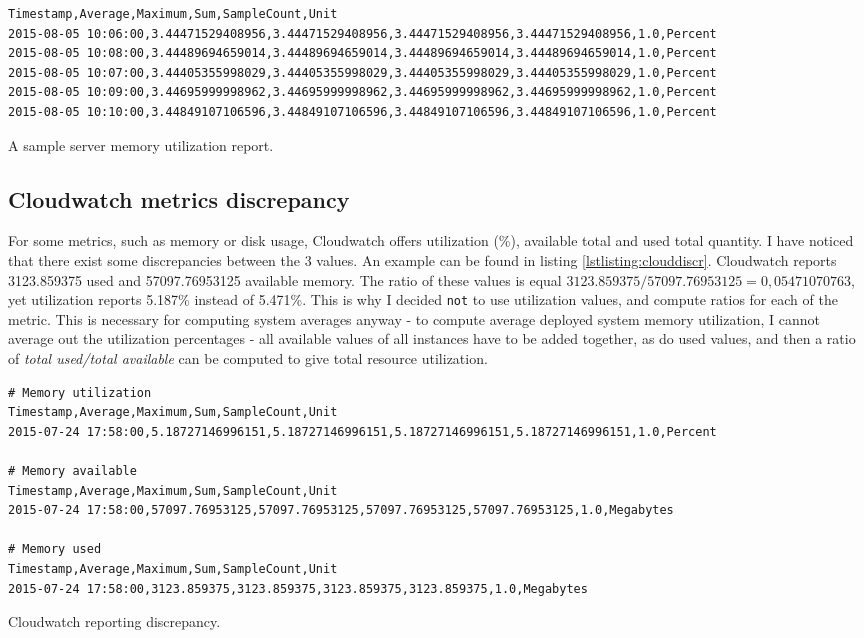 \documentclass{uvamscse}
\begin{document}
\begin{sourcecode}[H]
\begin{lstlisting}[style=mono]
Timestamp,Average,Maximum,Sum,SampleCount,Unit
2015-08-05 10:06:00,3.44471529408956,3.44471529408956,3.44471529408956,3.44471529408956,1.0,Percent
2015-08-05 10:08:00,3.44489694659014,3.44489694659014,3.44489694659014,3.44489694659014,1.0,Percent
2015-08-05 10:07:00,3.44405355998029,3.44405355998029,3.44405355998029,3.44405355998029,1.0,Percent
2015-08-05 10:09:00,3.44695999998962,3.44695999998962,3.44695999998962,3.44695999998962,1.0,Percent
2015-08-05 10:10:00,3.44849107106596,3.44849107106596,3.44849107106596,3.44849107106596,1.0,Percent
\end{lstlisting}
\caption{A sample server memory utilization report.}
\label{lstlisting:memutilsrv}
\end{sourcecode}

\subsection{Cloudwatch metrics discrepancy}

For some metrics, such as memory or disk usage, Cloudwatch offers utilization (\%), available total and used total quantity. I have noticed that there exist some discrepancies between the 3 values. An example can be found in listing \ref{lstlisting:clouddiscr}. Cloudwatch reports 3123.859375 used and 57097.76953125 available memory. The ratio of these values is equal $3123.859375 / 57097.76953125 = 0,05471070763$, yet utilization reports 5.187\% instead of 5.471\%. This is why I decided \texttt{not} to use utilization values, and compute ratios for each of the metric. This is necessary for computing system averages anyway - to compute average deployed system memory utilization, I cannot average out the utilization percentages - all available values of all instances have to be added together, as do used values, and then a ratio of \textit{total used/total available} can be computed to give total resource utilization.

\begin{sourcecode}[H]
\begin{lstlisting}[style=mono]
# Memory utilization
Timestamp,Average,Maximum,Sum,SampleCount,Unit
2015-07-24 17:58:00,5.18727146996151,5.18727146996151,5.18727146996151,5.18727146996151,1.0,Percent

# Memory available
Timestamp,Average,Maximum,Sum,SampleCount,Unit
2015-07-24 17:58:00,57097.76953125,57097.76953125,57097.76953125,57097.76953125,1.0,Megabytes

# Memory used
Timestamp,Average,Maximum,Sum,SampleCount,Unit
2015-07-24 17:58:00,3123.859375,3123.859375,3123.859375,3123.859375,1.0,Megabytes
\end{lstlisting}
\caption{Cloudwatch reporting discrepancy.}
\label{lstlisting:clouddiscr}
\end{sourcecode}
\end{document}
